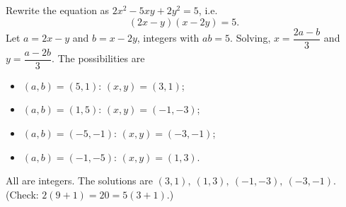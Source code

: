 Rewrite the equation as $2x^2-5xy+2y^2=5$, i.e.
\[
(2x-y)(x-2y)=5 .
\]
Let $a=2x-y$ and $b=x-2y$, integers with $ab=5$. Solving, $x=\dfrac{2a-b}{3}$ and $y=\dfrac{a-2b}{3}$. The possibilities are
\begin{itemize}
\item $(a,b)=(5,1)$: $(x,y)=(3,1)$;
\item $(a,b)=(1,5)$: $(x,y)=(-1,-3)$;
\item $(a,b)=(-5,-1)$: $(x,y)=(-3,-1)$;
\item $(a,b)=(-1,-5)$: $(x,y)=(1,3)$.
\end{itemize}
All are integers. The solutions are $\boxed{(3,1),\ (1,3),\ (-1,-3),\ (-3,-1)}$. (Check: $2(9+1)=20=5(3+1)$.)
